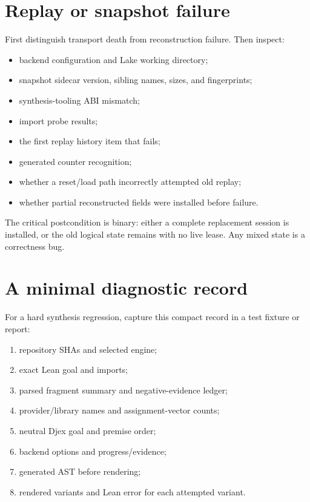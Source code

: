 \documentclass[10pt,letterpaper,oneside]{report}
\newcommand{\code}[1]{\texttt{\detokenize{#1}}}
\begin{document}
\section{Replay or snapshot failure}

First distinguish transport death from reconstruction failure. Then inspect:

\begin{itemize}
  \item backend configuration and Lake working directory;
  \item snapshot sidecar version, sibling names, sizes, and fingerprints;
  \item synthesis-tooling ABI mismatch;
  \item import probe results;
  \item the first replay history item that fails;
  \item generated \code{it} counter recognition;
  \item whether a reset/load path incorrectly attempted old replay;
  \item whether partial reconstructed fields were installed before failure.
\end{itemize}

The critical postcondition is binary: either a complete replacement session is installed, or the old logical state remains with no live lease. Any mixed state is a correctness bug.

\section{A minimal diagnostic record}

For a hard synthesis regression, capture this compact record in a test fixture or report:

\begin{enumerate}
  \item repository SHAs and selected engine;
  \item exact Lean goal and imports;
  \item parsed fragment summary and negative-evidence ledger;
  \item provider/library names and assignment-vector counts;
  \item neutral Djex goal and premise order;
  \item backend options and progress/evidence;
  \item generated AST before rendering;
  \item rendered variants and Lean error for each attempted variant.
\end{enumerate}
\end{document}
